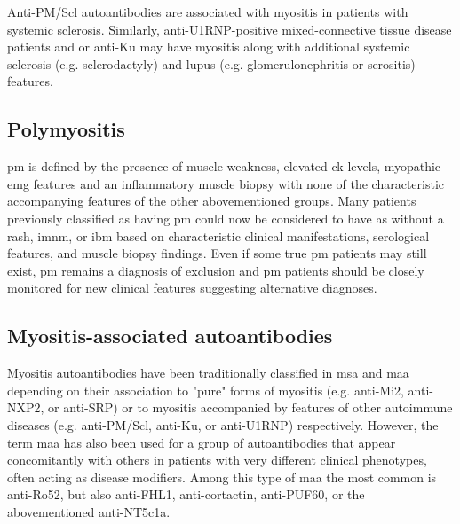 Anti-PM/Scl autoantibodies are associated with myositis in patients with systemic sclerosis.\cite{GuillenDelCastillo2014} Similarly, anti-U1RNP-positive mixed-connective tissue disease patients and or anti-Ku may have myositis along with additional systemic sclerosis (e.g. sclerodactyly) and lupus (e.g. glomerulonephritis or serositis) features.\cite{Rigolet2012,EscolaVerge2017}

\subsection{Polymyositis}

\gls{pm} is defined by the presence of muscle weakness, elevated \gls{ck} levels, myopathic \gls{emg} features and an inflammatory muscle biopsy with none of the characteristic accompanying features of the other abovementioned groups. Many patients previously classified as having \gls{pm} could now be considered to have \gls{as} without a rash, \gls{imnm}, or \gls{ibm} based on characteristic clinical manifestations, serological features, and muscle biopsy findings.\cite{Meulen2003,Chahin2008,Vilela2015} Even if some true \gls{pm} patients may still exist,\cite{Amato2003a} \gls{pm} remains a diagnosis of exclusion and \gls{pm} patients should be closely monitored for new clinical features suggesting alternative diagnoses.

\subsection{Myositis-associated autoantibodies}

Myositis autoantibodies have been traditionally classified in \gls{msa} and \gls{maa} depending on their association to "pure" forms of myositis (e.g. anti-Mi2, anti-NXP2, or anti-SRP) or to myositis accompanied by features of other autoimmune diseases (e.g. anti-PM/Scl, anti-Ku, or anti-U1RNP) respectively.\cite{McHugh2018} However, the term \gls{maa} has also been used for a group of autoantibodies that appear concomitantly with others in patients with very different clinical phenotypes, often acting as disease modifiers. Among this type of \gls{maa} the most common is anti-Ro52,\cite{PinalFernandez2017a,Vancsa2009,Bauhammer2016,Marie2012} but also anti-FHL1,\cite{Albrecht2015} anti-cortactin,\cite{LabradorHorrillo2014a} anti-PUF60,\cite{Fiorentino2016,Zhang2018} or the abovementioned anti-NT5c1a.\cite{Lloyd2016,Herbert2016,Muro2017,Lilleker2017,Goyal2016}


